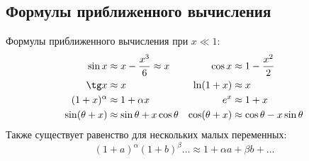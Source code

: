 \subsection{Формулы приближенного вычисления}
Формулы приближенного вычисления при $x \ll 1$:
\begin{align*}
	\sin x &\approx x - \frac{x^3}{6} \approx x & \cos x &\approx 1 - \frac{x^2}{2} \\
	\tg x &\approx x & \ln(1+x) &\approx x \\
	(1 + x)^\alpha &\approx 1 + \alpha x & e^x &\approx 1 + x \\
	\sin (\theta + x) &\approx \sin \theta + x \cos \theta & \cos(\theta + x) &\approx \cos \theta - x \sin \theta
\end{align*}
Также существует равенство для нескольких малых переменных:
\begin{equation*}
	(1 + a)^\alpha (1 + b)^\beta \ldots \approx 1 + \alpha a + \beta b + \ldots
\end{equation*}

